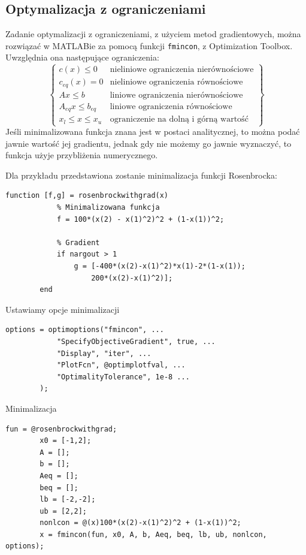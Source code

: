 \documentclass{article}
\begin{document}
    \subsection{Optymalizacja z ograniczeniami}
    Zadanie optymalizacji z ograniczeniami, z użyciem metod gradientowych, można rozwiązać w MATLABie za pomocą funkcji \texttt{fmincon}, z Optimization Toolbox.
    Uwzględnia ona następujące ograniczenia:
    $$
        \left\{
        \begin{array}{ll}
            c(x) \leq 0    & \textrm{nieliniowe ograniczenia nierównościowe}\\
            c_{eq}(x) = 0    & \textrm{nieliniowe ograniczenia równościowe}\\
            Ax \leq b   & \textrm{liniowe ograniczenia nierównościowe}\\
            A_{eq}x \leq b_{eq}   & \textrm{liniowe ograniczenia równościowe}\\
            x_{l} \leq x \leq x_{u} & \textrm{ograniczenie na dolną i górną wartość}
        \end{array}
        \right\}
    $$
    Jeśli minimalizowana funkcja znana jest w postaci analitycznej, to można podać jawnie wartość jej gradientu, jednak gdy nie możemy go jawnie wyznaczyć, to funkcja użyje przybliżenia numerycznego.

    Dla przykładu przedstawiona zostanie minimalizacja funkcji Rosenbrocka:
    \begin{lstlisting}[style=Matlab-editor]
        function [f,g] = rosenbrockwithgrad(x)
            % Minimalizowana funkcja
            f = 100*(x(2) - x(1)^2)^2 + (1-x(1))^2;

            % Gradient
            if nargout > 1
                g = [-400*(x(2)-x(1)^2)*x(1)-2*(1-x(1));
                    200*(x(2)-x(1)^2)];
        end
    \end{lstlisting}

    Ustawiamy opcje minimalizacji
    \begin{lstlisting}[style=Matlab-editor]
        options = optimoptions("fmincon", ...
            "SpecifyObjectiveGradient", true, ...
            "Display", "iter", ...
            "PlotFcn", @optimplotfval, ...
            "OptimalityTolerance", 1e-8 ...
        );
    \end{lstlisting}

    Minimalizacja
    \begin{lstlisting}[style=Matlab-editor]
        fun = @rosenbrockwithgrad;
        x0 = [-1,2];
        A = [];
        b = [];
        Aeq = [];
        beq = [];
        lb = [-2,-2];
        ub = [2,2];
        nonlcon = @(x)100*(x(2)-x(1)^2)^2 + (1-x(1))^2;
        x = fmincon(fun, x0, A, b, Aeq, beq, lb, ub, nonlcon, options);
    \end{lstlisting}
\end{document}
